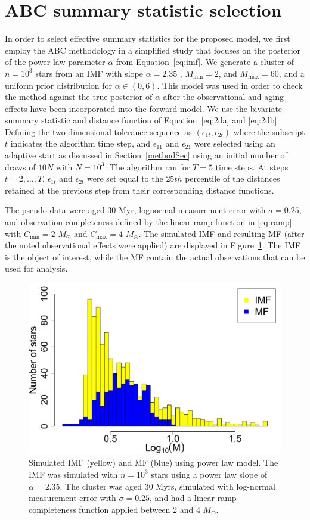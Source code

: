 \documentclass[ejs]{imsart}
\numberwithin{equation}{section}
\theoremstyle{plain}
\newcommand{\Msun}{M_{\odot}}
\newcommand{\Cmin}{C_{\text{min}}}
\newcommand{\Cmax}{C_{\text{max}}}
\newcommand{\Mmax}{M_{\text{max}}}
\newcommand{\Mmin}{M_{\text{min}}}
\begin{document}
\section{ABC summary statistic selection} \label{app:summary}
In order to select effective summary statistics for the proposed model, we first employ the ABC methodology in a simplified study that focuses on the posterior of the power law parameter $\alpha$ from Equation~\eqref{eq:imf}.  We generate a cluster of $n = 10^3$ stars from an IMF with slope $\alpha = 2.35$  \citep{salpeter55}, $\Mmin = 2$, and $\Mmax = 60$,  and a uniform prior distribution for $\alpha \in (0, 6)$.  
%
This  model was used in order to check the method against the true posterior of $\alpha$ after the observational and aging effects have been incorporated into the forward model.  We use the bivariate summary statistic and distance function of Equation~\eqref{eq:2da} and \eqref{eq:2db}.  Defining the two-dimensional tolerance sequence as $(\epsilon_{1t}, \epsilon_{2t})$ where the subscript $t$ indicates the algorithm time step, and  $\epsilon_{11}$ and $\epsilon_{21}$ were selected using an adaptive start as discussed in Section~\ref{methodSec} using an initial number of draws of $10N$ with $N = 10^3$.  The algorithm ran for $T = 5$ time steps.
At steps $t = 2,\ldots,T$, $\epsilon_{1t}$ and $\epsilon_{2t}$ were set equal to the $25th$ percentile of the distances retained at the previous step from their corresponding distance functions.


The pseudo-data were aged 30 Myr, lognormal measurement error with $\sigma = 0.25$, and observation completeness defined by the linear-ramp function in \eqref{eq:ramp} with $\Cmin = 2$ $\Msun$ and $\Cmax = 4$ $\Msun$.  The simulated IMF and resulting MF (after the noted observational effects were applied) are displayed in Figure~\ref{fig:abc_simple_data}.  The IMF is the object of interest, while the MF contain the actual observations that can be used for analysis.

\begin{figure}[htbp]
\centering
\includegraphics[width=.5\textwidth]{figures/sim_basic_imf_mf_log10.pdf}       
\caption{Simulated IMF (yellow) and MF (blue) using power law model.  The IMF was simulated with $n = 10^3$ stars using a power law slope of $\alpha = 2.35$.  The cluster was aged 30 Myrs, simulated with log-normal measurement error with $\sigma = 0.25$, and had a linear-ramp completeness function applied between 2 and 4 $\Msun$.
} \label{fig:abc_simple_data}
\end{figure}
\end{document}
